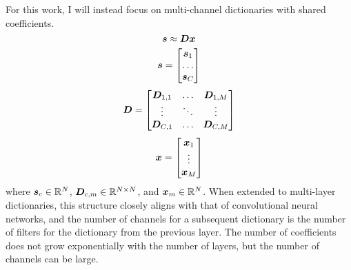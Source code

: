 For this work, I will instead focus on multi-channel dictionaries with shared coefficients.
%
\begin{equation}
\bm{s} \approx \bm{D}\bm{x}
\end{equation}
\begin{equation}
\bm{s} = \begin{bmatrix} \bm{s}_1 \\ \hdots \\ \bm{s}_C \end{bmatrix}
\end{equation}
\begin{equation}
\bm{D} = \begin{bmatrix} \bm{D}_{1,1} & \hdots & \bm{D}_{1,M}  \\ \vdots & \ddots & \vdots \\ \bm{D}_{C,1} & \hdots & \bm{D}_{C,M} \end{bmatrix}
\end{equation}
\begin{equation}
\bm{x} = \begin{bmatrix} \bm{x}_1 \\ \vdots \\ \bm{x}_M \end{bmatrix}
\end{equation}
where $\bm{s}_c \in \mathbb{R}^N$, $\bm{D}_{c,m} \in \mathbb{R}^{N \times N}$, and $\bm{x}_{m} \in \mathbb{R}^N$.
%
When extended to multi-layer dictionaries, this structure closely aligns with that of convolutional neural networks,  and the number of channels for a subsequent dictionary is the number of filters for the dictionary from the previous layer. The number of coefficients does not grow exponentially with the number of layers, but the number of channels can be large.




